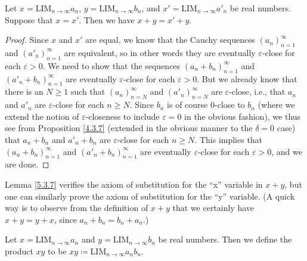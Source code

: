 \begin{lemma}\label{5.3.7}
    Let \(x = \text{LIM}_{n \to \infty} a_n\), \(y = \text{LIM}_{n \to \infty} b_n\), and \(x' = \text{LIM}_{n \to \infty} a'_n\) be real numbers.
    Suppose that \(x = x'\).
    Then we have \(x + y = x' + y\).
\end{lemma}

\begin{proof}
    Since \(x\) and \(x'\) are equal, we know that the Cauchy sequences \((a_n)_{n = 1}^{\infty}\) and \((a'_n)_{n = 1}^{\infty}\) are equivalent, so in other words they are eventually \(\varepsilon\)-close for each \(\varepsilon > 0\).
    We need to show that the sequences \((a_n + b_n)_{n = 1}^{\infty}\) and \((a'_n + b_n)_{n = 1}^{\infty}\) are eventually \(\varepsilon\)-close for each \(\varepsilon > 0\).
    But we already know that there is an \(N \geq 1\) such that \((a_n)_{n = N}^{\infty}\) and \((a'_n)_{n = N}^{\infty}\) are \(\varepsilon\)-close, i.e., that \(a_n\) and \(a'_n\) are \(\varepsilon\)-close for each \(n \geq N\).
    Since \(b_n\) is of course \(0\)-close to \(b_n\) (where we extend the notion of \(\varepsilon\)-closeness to include \(\varepsilon = 0\) in the obvious fashion), we thus see from Proposition \ref{4.3.7} (extended in the obvious manner to the \(\delta = 0\) case) that \(a_n + b_n\) and \(a'_n + b_n\) are \(\varepsilon\)-close for each \(n \geq N\).
    This implies that \((a_n + b_n)_{n = 1}^{\infty}\) and \((a'_n + b_n)_{n = 1}^{\infty}\) are eventually \(\varepsilon\)-close for each \(\varepsilon > 0\), and we are done.
\end{proof}

\begin{remark}\label{5.3.8}
    Lemma \ref{5.3.7} verifies the axiom of substitution for the ``x'' variable in \(x + y\), but one can similarly prove the axiom of substitution for the ``y'' variable.
    (A quick way is to observe from the definition of \(x + y\) that we certainly have \(x + y = y + x\), since \(a_n + b_n = b_n + a_n\).)
\end{remark}

\begin{definition}\label{5.3.9}
    Let \(x = \text{LIM}_{n \to \infty} a_n\) and \(y = \text{LIM}_{n \to \infty} b_n\) be real numbers.
    Then we define the product \(xy\) to be \(xy \coloneqq \text{LIM}_{n \to \infty} a_n b_n\).
\end{definition}

